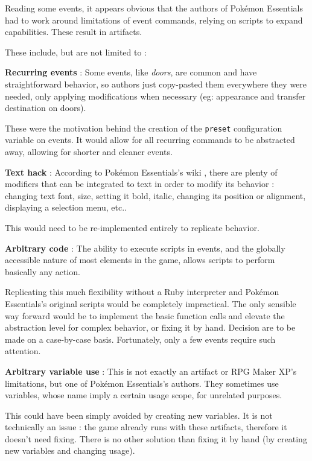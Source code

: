 \documentclass[11pt]{article}
\begin{document}
{Reading some events, it appears obvious that the authors of Pokémon Essentials had to work around limitations of event commands, relying on scripts to expand capabilities. These result in artifacts.

These include, but are not limited to :

\textbf{Recurring events} : Some events, like \textit{doors}, are common and have straightforward behavior, so authors just copy-pasted them everywhere they were needed, only applying modifications when necessary (eg: appearance and transfer destination on doors).

These were the motivation behind the creation of the \verb|preset| configuration variable on events. It would allow for all recurring commands to be abstracted away, allowing for shorter and cleaner events.

\textbf{Text hack} : According to Pokémon Essentials's wiki \cite{PEmessages}, there are plenty of modifiers that can be integrated to text in order to modify its behavior : changing text font, size, setting it bold, italic, changing its position or alignment, displaying a selection menu, etc..

This would need to be re-implemented entirely to replicate behavior.

\textbf{Arbitrary code} : The ability to execute scripts in events, and the globally accessible nature of most elements in the game, allows scripts to perform basically any action.

Replicating this much flexibility without a Ruby interpreter and Pokémon Essentials's original scripts would be completely impractical. The only sensible way forward would be to implement the basic function calls and elevate the abstraction level for complex behavior, or fixing it by hand. Decision are to be made on a case-by-case basis. Fortunately, only a few events require such attention.

\textbf{Arbitrary variable use} : This is not exactly an artifact or RPG Maker XP's limitations, but one of Pokémon Essentials's authors. They sometimes use variables,  whose name imply a certain usage scope, for unrelated purposes. 

This could have been simply avoided by creating new variables. It is not technically an issue : the game already runs with these artifacts, therefore it doesn't need fixing. There is no other solution than fixing it by hand (by creating new variables and changing usage).











}
\end{document}
